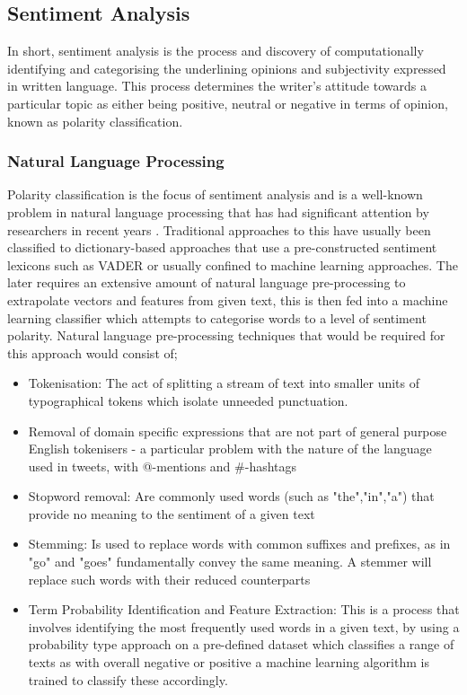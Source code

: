\documentclass[oneside, 10pt]{article}
\begin{document}
		
		\subsection{Sentiment Analysis}\label{sentiment}
		In short, sentiment analysis is the process and discovery of computationally identifying and categorising the underlining opinions and subjectivity expressed in written language. This process determines the writer's attitude towards a particular topic as either being positive, neutral or negative in terms of opinion, known as polarity classification. 		
			
			\subsubsection{Natural Language Processing}\label{algorithms}
			Polarity classification is the focus of sentiment analysis and is a well-known problem in natural language processing that has had significant attention by researchers in recent years \cite{1}\cite{3}\cite{6}\cite{10}. Traditional approaches to this have usually been classified to dictionary-based approaches that use a pre-constructed sentiment lexicons such as VADER or usually confined to machine learning approaches. The later requires an extensive amount of natural language pre-processing to extrapolate vectors and features from given text, this is then fed into a machine learning classifier which attempts to categorise words to a level of sentiment polarity. Natural language pre-processing techniques that would be required for this approach would consist of;
			
			\begin{itemize}
				\item Tokenisation: The act of splitting a stream of text into smaller units of typographical tokens which isolate unneeded punctuation.
				\item Removal of domain specific expressions that are not part of general purpose English tokenisers - a particular problem with the nature of the language used in tweets, with @-mentions and \#-hashtags
				\item Stopword removal: Are commonly used words (such as "the","in","a") that provide no meaning to the sentiment of a given text
				\item Stemming: Is used to replace words with common suffixes and prefixes, as in "go" and "goes" fundamentally convey the same meaning. A stemmer will replace such words with their reduced counterparts
				\item Term Probability Identification and Feature Extraction: This is a process that involves identifying the most frequently used words in a given text, by using a probability type approach on a pre-defined dataset which classifies a range of texts as with overall negative or positive a machine learning algorithm is trained to classify these accordingly.
			\end{itemize}
			
\end{document}
